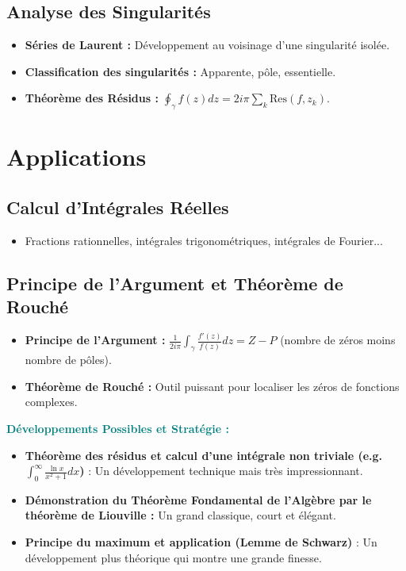 \documentclass[12pt, a4paper, parskip=full]{report}
\theoremstyle{agregstyle}
\newenvironment{developpements}
  {\par\medskip\noindent\begin{oframed}\noindent\textbf{\textcolor{teal}{Développements Possibles et Stratégie :}}}
  {\end{oframed}\par\medskip}
\begin{document}
\subsection{Analyse des Singularités}
\begin{itemize}
    \item \textbf{Séries de Laurent :} Développement au voisinage d'une singularité isolée.
    \item \textbf{Classification des singularités :} Apparente, pôle, essentielle.
    \item \textbf{Théorème des Résidus :} $\oint_\gamma f(z) dz = 2i\pi \sum_k \mathrm{Res}(f, z_k)$.
\end{itemize}

\section{Applications}
\subsection{Calcul d'Intégrales Réelles}
\begin{itemize}
    \item Fractions rationnelles, intégrales trigonométriques, intégrales de Fourier...
\end{itemize}
\subsection{Principe de l'Argument et Théorème de Rouché}
\begin{itemize}
    \item \textbf{Principe de l'Argument :} $\frac{1}{2i\pi} \int_\gamma \frac{f'(z)}{f(z)}dz = Z-P$ (nombre de zéros moins nombre de pôles).
    \item \textbf{Théorème de Rouché :} Outil puissant pour localiser les zéros de fonctions complexes.
\end{itemize}

\begin{developpements}
    \begin{itemize}
        \item \textbf{Théorème des résidus et calcul d'une intégrale non triviale (e.g. $\int_0^\infty \frac{\ln x}{x^2+1}dx$)} : Un développement technique mais très impressionnant.
        \item \textbf{Démonstration du Théorème Fondamental de l'Algèbre par le théorème de Liouville :} Un grand classique, court et élégant.
        \item \textbf{Principe du maximum et application (Lemme de Schwarz)} : Un développement plus théorique qui montre une grande finesse.
    \end{itemize}
\end{developpements}
\end{document}
